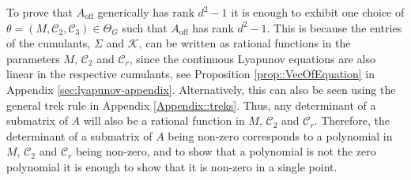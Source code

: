 \documentclass{biometrika}
\begin{document}
    To prove that $A_{\mathrm{off}}$ generically has rank $d^2-1$ it is enough to exhibit one choice of \mbox{$\theta = (M, \mathcal{C}_2, \mathcal{C}_3) \in \Theta_G$} such that $A_{\mathrm{off}}$ has rank $d^2-1$. This is because the entries of the cumulants, $\Sigma$ and $\mathcal{K}$, can be written as rational functions in the parameters $M$, $\mathcal{C}_2$ and $\mathcal{C}_r$, since the continuous Lyapunov equations are also linear in the respective cumulants, see Proposition \ref{prop::VecOfEquation} in Appendix \ref{sec:lyapunov-appendix}. Alternatively, this can also be seen using the general trek rule in Appendix \ref{Appendix::treks}. Thus, any determinant of a submatrix of $A$ will also be a rational function in $M$, $\mathcal{C}_2$ and $\mathcal{C}_r$. Therefore, the determinant of a submatrix of $A$ being non-zero corresponds to a polynomial in $M$, $\mathcal{C}_2$ and $\mathcal{C}_r$ being non-zero, and to show that a polynomial is not the zero polynomial it is enough to show that it is non-zero in a single point. 
\end{document}
